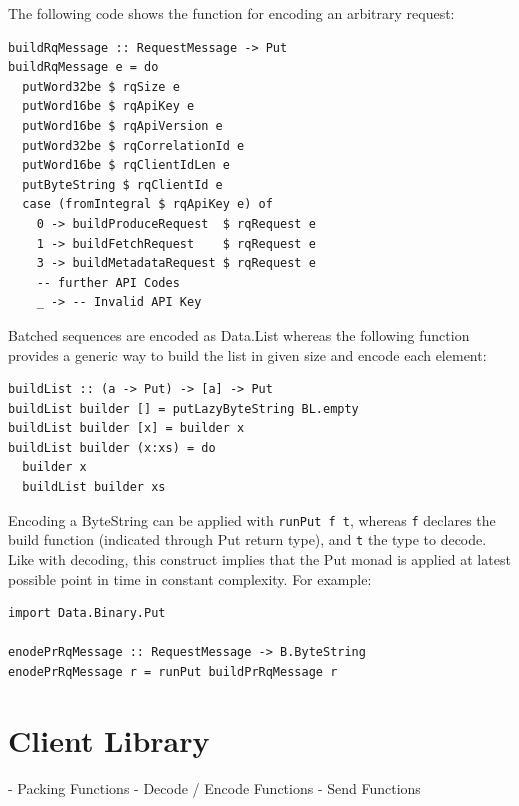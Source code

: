 The following code shows the function for encoding an arbitrary request:
\begin{lstlisting}
buildRqMessage :: RequestMessage -> Put
buildRqMessage e = do
  putWord32be $ rqSize e
  putWord16be $ rqApiKey e
  putWord16be $ rqApiVersion e
  putWord32be $ rqCorrelationId e
  putWord16be $ rqClientIdLen e
  putByteString $ rqClientId e
  case (fromIntegral $ rqApiKey e) of
    0 -> buildProduceRequest  $ rqRequest e
    1 -> buildFetchRequest    $ rqRequest e
    3 -> buildMetadataRequest $ rqRequest e
    -- further API Codes 
    _ -> -- Invalid API Key 
\end{lstlisting}

Batched sequences are encoded as Data.List whereas the following function
provides a generic way to build the list in given size and encode each element:
\begin{lstlisting}
buildList :: (a -> Put) -> [a] -> Put
buildList builder [] = putLazyByteString BL.empty
buildList builder [x] = builder x
buildList builder (x:xs) = do 
  builder x
  buildList builder xs
\end{lstlisting}

Encoding a ByteString can be applied with \lstinline{runPut f t}, whereas
\lstinline{f} declares the build function (indicated through Put return type),
and  \lstinline{t} the type to decode. Like with decoding, this construct
implies that the Put monad is applied at latest possible point in time in
constant complexity. For example: 
\begin{lstlisting}
import Data.Binary.Put

enodePrRqMessage :: RequestMessage -> B.ByteString
enodePrRqMessage r = runPut buildPrRqMessage r

\end{lstlisting}

\section{Client Library}
- Packing Functions
- Decode / Encode Functions
- Send Functions 
